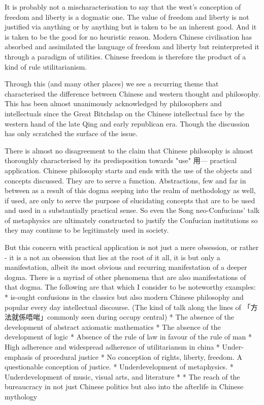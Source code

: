 It is probably not a mischaracterisation to say that the west's conception of freedom and liberty is a dogmatic one. The value of freedom and liberty is not justified via anything or by anything but is taken to be an inherent good. And it is taken to be the good for no heuristic reason. Modern Chinese civilisation has absorbed and assimilated the language of freedom and liberty but reinterpreted it through a paradigm of utilities. Chinese freedom is therefore the product of a kind of rule utilitarianism. 

Through this (and many other places) we see a recurring theme that characterised the difference between Chinese and western thought and philosophy. This has been almost unanimously acknowledged by philosophers and intellectuals since the Great  Bitchslap on the Chinese intellectual face by the western hand of the late Qing and early republican era. Though the discussion has only scratched the surface of the issue.

There is almost no disagreement to the claim that Chinese philosophy is almost thoroughly characterised by its predisposition towards "use" 用— practical application. Chinese philosophy starts and ends with the use of the objects and concepts discussed. They are to serve a function. Abstractions, few and far in between as a result of this dogma seeping into the realm of methodology as well, if used, are only to serve the purpose of elucidating concepts that are to be used and used in a substantially practical sense. So even the Song neo-Confucians' talk of metaphysics are ultimately constructed to justify the Confucian institutions so they may continue to be legitimately used in society. 

But this concern with practical application is not just a mere obsession, or rather - it is a not an obsession that lies at the root of it all, it is but only a manifestation, albeit its most obvious and recurring manifestation of a deeper dogma. There is a myriad of other phenomena that are also manifestations of that dogma. The following are that which I consider to be noteworthy examples: 
* is-ought confusions in the classics but also modern Chinese philosophy and popular every day intellectual discourse. (The kind of talk along the lines of 「方法就係唔啱」commonly seen during occupy central) 
* The absence of the development of abstract axiomatic mathematics 
* The absence of the development of logic 
* Absence of the rule of law in favour of the rule of man 
* High adherence and widespread adherence of utilitariansm in china 
* Under-emphasis of procedural justice 
* No conception of rights, liberty, freedom. A questionable conception of justice. 
* Underdevelopment of metaphysics. 
* Underdevelopment of music, visual arts, and literature 
* * The reach of the bureaucracy in not just Chinese politics but also into the afterlife in Chinese mythology

